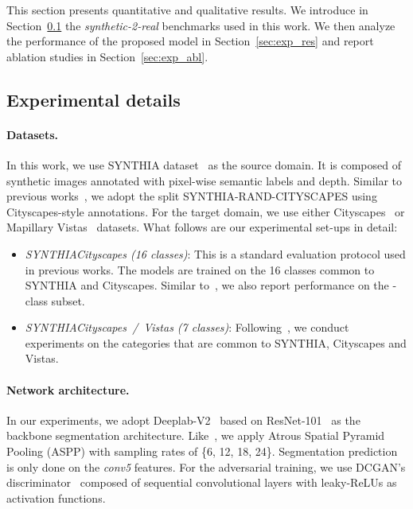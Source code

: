 \documentclass[10pt,twocolumn,letterpaper]{article}
\begin{document}
This section presents quantitative and qualitative results. 
We introduce in Section~\ref{sec:exp_details} the \textit{synthetic-2-real} benchmarks used in this work.
We then analyze the performance of the proposed model in Section~\ref{sec:exp_res} and report ablation studies in Section~\ref{sec:exp_abl}.

\subsection{Experimental details}
\label{sec:exp_details}

\paragraph{Datasets.}
In this work, we use SYNTHIA dataset~\cite{Ros_2016_CVPR} as the source domain.
It is composed of  synthetic images annotated with pixel-wise semantic labels and depth.
Similar to previous works~\cite{lee2018spigan, tsai2018learning, vu2018advent}, we adopt the split SYNTHIA-RAND-CITYSCAPES using Cityscapes-style annotations.
For the target domain, we use either Cityscapes~\cite{cordts2016cityscapes} or Mapillary Vistas~\cite{MVD2017} datasets.
What follows are our experimental set-ups in detail:
\begin{itemize}
	\item \textit{SYNTHIACityscapes (16 classes)}: This is a standard evaluation protocol used in previous works. The models are trained on the 16 classes common to SYNTHIA and Cityscapes. Similar to~\cite{tsai2018learning, vu2018advent}, we also report performance on the -class subset.
	\item \textit{SYNTHIACityscapes~/~Vistas (7 classes)}: Following~\cite{lee2018spigan}, we conduct experiments on the  categories that are common to SYNTHIA, Cityscapes and Vistas.
\end{itemize}
\paragraph{Network architecture.}
In our experiments, we adopt Deeplab-V2~\cite{chen2018deeplab} based on ResNet-101~\cite{He2015} as the backbone segmentation architecture.
Like~\cite{tsai2018learning, vu2018advent}, we apply Atrous Spatial Pyramid Pooling (ASPP) with sampling rates of \{6, 12, 18, 24\}.
Segmentation prediction is only done on the \textit{conv5} features.
For the adversarial training, we use DCGAN's discriminator~\cite{radford2015unsupervised} composed of  sequential convolutional layers with leaky-ReLUs as activation functions.
\end{document}
